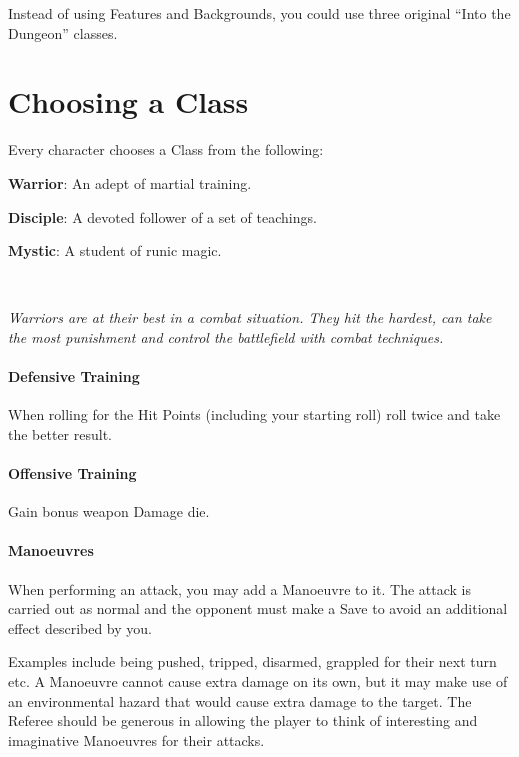 \documentclass[itdr]{subfiles}
\begin{document}
\cleartoleftpage


Instead of using Features and Backgrounds, you could use three original ``Into the Dungeon'' classes.

\section{Choosing a Class}

Every character chooses a Class from the following:

\textbf{Warrior}: An adept of martial training.

\textbf{Disciple}: A devoted follower of a set of teachings.

\textbf{Mystic}: A student of runic magic.

~

{\em Warriors are at their best in a combat situation. They hit the hardest, can take the most punishment and control the battlefield with combat techniques.}

\paragraph{Defensive Training}
When rolling for the Hit Points (including your starting roll) roll twice and take the better result.

\paragraph{Offensive Training}
Gain bonus weapon Damage die.

\paragraph{Manoeuvres}
When performing an attack, you may add a Manoeuvre to it. The attack is carried out as normal and the opponent must make a Save to avoid an additional effect described by you.

Examples include being pushed, tripped, disarmed, grappled for their next turn etc. A Manoeuvre cannot cause extra damage on its own, but it may make use of an environmental hazard that would cause extra damage to the target. The Referee should be generous in allowing the player to think of interesting and imaginative Manoeuvres for their attacks.

\vfill
\break
\end{document}

